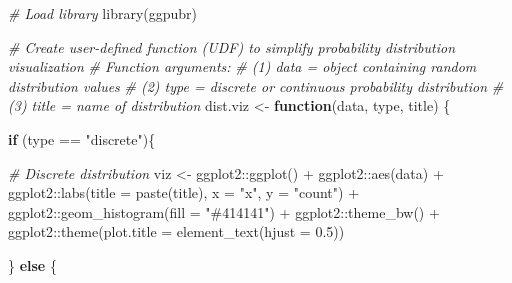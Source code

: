 \documentclass[
]{book}
\newenvironment{Shaded}{\begin{snugshade}}{\end{snugshade}}
\newcommand{\AttributeTok}[1]{\textcolor[rgb]{0.77,0.63,0.00}{#1}}
\newcommand{\CommentTok}[1]{\textcolor[rgb]{0.56,0.35,0.01}{\textit{#1}}}
\newcommand{\ControlFlowTok}[1]{\textcolor[rgb]{0.13,0.29,0.53}{\textbf{#1}}}
\newcommand{\FloatTok}[1]{\textcolor[rgb]{0.00,0.00,0.81}{#1}}
\newcommand{\FunctionTok}[1]{\textcolor[rgb]{0.00,0.00,0.00}{#1}}
\newcommand{\NormalTok}[1]{#1}
\newcommand{\OtherTok}[1]{\textcolor[rgb]{0.56,0.35,0.01}{#1}}
\newcommand{\SpecialCharTok}[1]{\textcolor[rgb]{0.00,0.00,0.00}{#1}}
\newcommand{\StringTok}[1]{\textcolor[rgb]{0.31,0.60,0.02}{#1}}
\begin{document}
\begin{Shaded}
\begin{Highlighting}[]
\CommentTok{\# Load library}
\FunctionTok{library}\NormalTok{(ggpubr)}

\CommentTok{\# Create user{-}defined function (UDF) to simplify probability distribution visualization}
\CommentTok{\# Function arguments:}
\CommentTok{\#   (1) data = object containing random distribution values }
\CommentTok{\#   (2) type = \textquotesingle{}discrete\textquotesingle{} or \textquotesingle{}continuous\textquotesingle{} probability distribution}
\CommentTok{\#   (3) title = name of distribution}
\NormalTok{dist.viz }\OtherTok{\textless{}{-}} \ControlFlowTok{function}\NormalTok{(data, type, title) \{}
  
  \ControlFlowTok{if}\NormalTok{ (type }\SpecialCharTok{==} \StringTok{"discrete"}\NormalTok{)\{}
    
    \CommentTok{\# Discrete distribution}
\NormalTok{    viz }\OtherTok{\textless{}{-}}\NormalTok{ ggplot2}\SpecialCharTok{::}\FunctionTok{ggplot}\NormalTok{() }\SpecialCharTok{+} 
\NormalTok{           ggplot2}\SpecialCharTok{::}\FunctionTok{aes}\NormalTok{(data) }\SpecialCharTok{+} 
\NormalTok{           ggplot2}\SpecialCharTok{::}\FunctionTok{labs}\NormalTok{(}\AttributeTok{title =} \FunctionTok{paste}\NormalTok{(title), }\AttributeTok{x =} \StringTok{"x"}\NormalTok{, }\AttributeTok{y =} \StringTok{"count"}\NormalTok{) }\SpecialCharTok{+} 
\NormalTok{           ggplot2}\SpecialCharTok{::}\FunctionTok{geom\_histogram}\NormalTok{(}\AttributeTok{fill =} \StringTok{"\#414141"}\NormalTok{) }\SpecialCharTok{+}
\NormalTok{           ggplot2}\SpecialCharTok{::}\FunctionTok{theme\_bw}\NormalTok{() }\SpecialCharTok{+}
\NormalTok{           ggplot2}\SpecialCharTok{::}\FunctionTok{theme}\NormalTok{(}\AttributeTok{plot.title =} \FunctionTok{element\_text}\NormalTok{(}\AttributeTok{hjust =} \FloatTok{0.5}\NormalTok{))}
    
\NormalTok{  \} }\ControlFlowTok{else}\NormalTok{ \{}
    

\end{Highlighting}
\end{Shaded}
\end{document}
